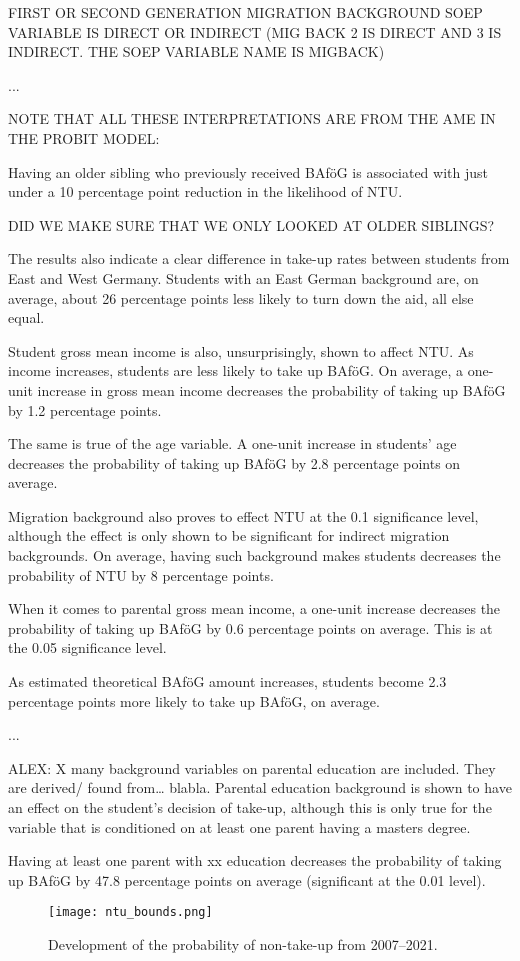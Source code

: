FIRST OR SECOND GENERATION MIGRATION BACKGROUND SOEP VARIABLE IS DIRECT OR INDIRECT (MIG BACK 2 IS DIRECT AND 3 IS INDIRECT. THE SOEP VARIABLE NAME IS MIGBACK)

...

NOTE THAT ALL THESE INTERPRETATIONS ARE FROM THE AME IN THE PROBIT MODEL:

Having an older sibling who previously received BAföG is associated with just under a 10 percentage point reduction in the likelihood of NTU.

DID WE MAKE SURE THAT WE ONLY LOOKED AT OLDER SIBLINGS?

The results also indicate a clear difference in take-up rates between students from East and West Germany. Students with an East German background are, on average, about 26 percentage points less likely to turn down the aid, all else equal.

Student gross mean income is also, unsurprisingly, shown to affect NTU. As income increases, students are less likely to take up BAföG. On average, a one-unit increase in gross mean income decreases the probability of taking up BAföG by 1.2 percentage points.

The same is true of the age variable. A one-unit increase in students' age decreases the probability of taking up BAföG by 2.8 percentage points on average.

Migration background also proves to effect NTU at the 0.1 significance level, although the effect is only shown to be significant for indirect migration backgrounds. On average, having such background makes students decreases the probability of NTU by 8 percentage points.

When it comes to parental gross mean income, a one-unit increase decreases the probability of taking up BAföG by 0.6 percentage points on average. This is at the 0.05 significance level.

As estimated theoretical BAföG amount increases, students become 2.3 percentage points more likely to take up BAföG, on average.

...

ALEX: X many background variables on parental education are included. They are derived/ found from… blabla.
Parental education background is shown to have an effect on the student’s decision of take-up, although this is only true for the variable that is conditioned on at least one parent having a masters degree.

Having at least one parent with xx education decreases the probability of taking up BAföG by 47.8 percentage points on average (significant at the 0.01 level).



\begin{figure}[htbp]
  \centering
  \texttt{[image: ntu\_bounds.png]}
  \caption{Development of the probability of non-take-up from 2007--2021.}
  \label{fig:ntu_bounds_over_years}
\end{figure}

